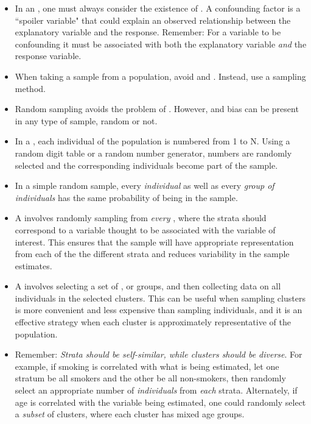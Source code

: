 \begin{itemize}
\item In an , one must always consider the existence of .  A confounding factor is a ``spoiler variable" that could explain an observed relationship between the explanatory variable and the response.  Remember:  For a variable to be confounding it must be associated with both the explanatory variable \textit{and} the response variable.

\item When taking a sample from a population, avoid  and .  Instead, use a  sampling method.

\item Random sampling avoids the problem of .  However,  and  bias can be present in any type of sample, random or not.

\item In a , each individual of the population is numbered from 1 to N.  Using a random digit table or a random number generator, numbers are randomly selected and the corresponding individuals become part of the sample.

\item In a simple random sample, every \textit{individual} as well as every \textit{group of individuals} has the same probability of being in the sample.

\item A  involves randomly sampling from \textit{every}  , where the strata should correspond to a variable thought to be associated with the variable of interest.  This ensures that the sample will have appropriate representation from each of the the different strata and reduces variability in the sample estimates.

\item A  involves selecting a set of , or groups, and then collecting data on all individuals in the selected clusters. This can be useful when sampling clusters is more convenient and less expensive than sampling individuals, and it is an effective strategy when each cluster is approximately representative of the population.  

\item Remember:  \textit{Strata should be self-similar, while clusters should be diverse}.  For example, if smoking is correlated with what is being estimated, let one stratum be all smokers and the other be all non-smokers, then randomly select an appropriate number of \textit{individuals} from \textit{each} strata.  Alternately, if age is correlated with the variable being estimated, one could randomly select a \textit{subset} of clusters, where each cluster has mixed age groups.  

\end{itemize}

